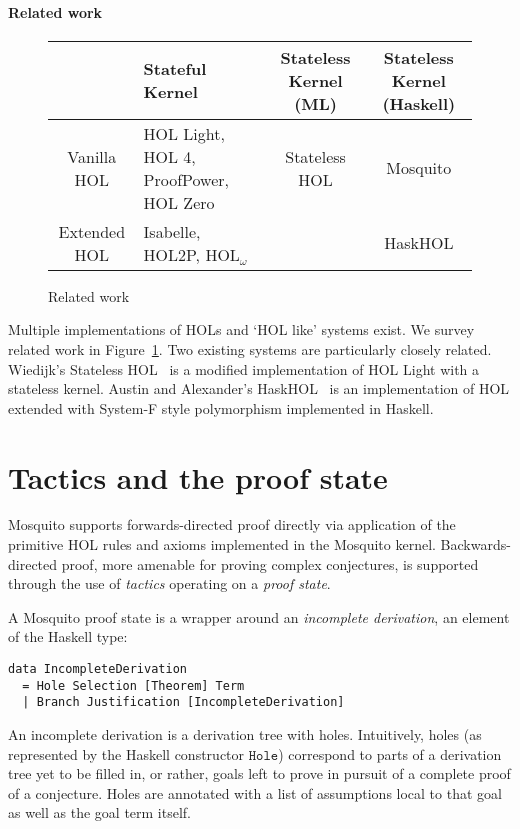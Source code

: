 \documentclass{llncs}
\begin{document}
\paragraph{Related work}
\begin{figure}
    \begin{tabular}{c||p{2.5cm}|c|c}
    ~            & Stateful Kernel                        & Stateless Kernel (ML) & Stateless Kernel (Haskell) \\ \hline\hline
    Vanilla HOL  & HOL Light, HOL 4, ProofPower, HOL Zero & Stateless HOL         & Mosquito                   \\ \hline
    Extended HOL & Isabelle, HOL2P, HOL$_\omega$          & ~                     & HaskHOL                    \\
    \end{tabular}
\caption{Related work}
\label{fig.related.work}
\end{figure}
Multiple implementations of HOLs and `HOL like' systems exist.
We survey related work in Figure~\ref{fig.related.work}.
Two existing systems are particularly closely related.
Wiedijk's Stateless HOL~\cite{wiedijk:stateless:2011} is a modified implementation of HOL Light with a stateless kernel.
Austin and Alexander's HaskHOL~\cite{austin:stateless:2013} is an implementation of HOL extended with System-F style polymorphism implemented in Haskell.

\section{Tactics and the proof state}
\label{sect.tactics.proof.state}

Mosquito supports forwards-directed proof directly via application of the primitive HOL rules and axioms implemented in the Mosquito kernel.
Backwards-directed proof, more amenable for proving complex conjectures, is supported through the use of \emph{tactics} operating on a \emph{proof state}.

A Mosquito proof state is a wrapper around an \emph{incomplete derivation}, an element of the Haskell type:
\begin{lstlisting}
data IncompleteDerivation
  = Hole Selection [Theorem] Term
  | Branch Justification [IncompleteDerivation]
\end{lstlisting}
An incomplete derivation is a derivation tree with holes.
Intuitively, holes (as represented by the Haskell constructor $\mathtt{Hole}$) correspond to parts of a derivation tree yet to be filled in, or rather, goals left to prove in pursuit of a complete proof of a conjecture.
Holes are annotated with a list of assumptions local to that goal as well as the goal term itself.
\end{document}

